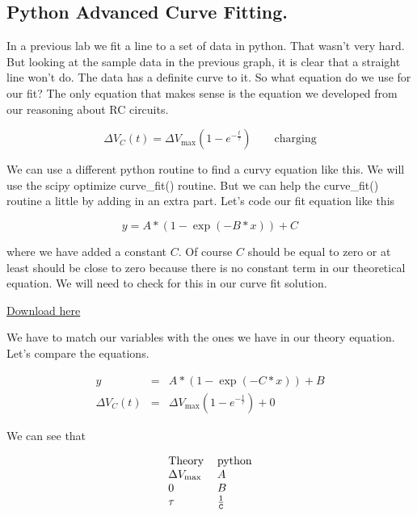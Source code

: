 \subsection{Python Advanced Curve Fitting.}

In a previous lab we fit a line to a set of data in python. That wasn't very hard. But looking at the sample data in the previous graph, it is clear that a straight line won't do.  The data has a definite curve to it. So what equation do we use for our fit? The only equation that makes sense is the equation we developed from our reasoning about RC circuits.

\begin{equation*}
	\Delta V_{C}\left( t\right) =\Delta V_{\max }\left( 1-e^{-\frac{t}{\tau }}\right) \qquad \text{charging}
\end{equation*}

We can use a different python routine to find a curvy equation like this.  We will use the scipy optimize curve\_fit() routine. But we can help the curve\_fit() routine a little by adding in an extra part. Let's code our fit equation like this

\begin{equation*}
	y=A\ast (1-\exp (-B\ast x))+C
\end{equation*}

where we have added a constant $C$. Of course $C$ should be equal to zero or at least should be close to zero because there is no constant term in our theoretical equation. We will need to check for this in our curve fit solution. 

\href{https://raw.githubusercontent.com/rtlines/IntermediateLabPH250/main/Code/user_function_curve_fit_2.py}{Download here}



We have to match our variables with the ones we have in our theory equation. Let's compare the equations. 

\begin{eqnarray*}
	y &=&A\ast (1-\exp (-C\ast x))+B \\
	\Delta V_{C}\left( t\right) &=&\Delta V_{\max }\left( 1-e^{-\frac{t}{\tau }}\right) +0
\end{eqnarray*}

We can see that 

\begin{equation*}
	\begin{tabular}{ll}
	                Theory & python \\ 
		$\Delta V_{\max }$ & $A$ \\ 
	                   $0$ & $B$ \\ 
	               $\tau $ & $\frac{1}{\mathtt{C}}$%
	\end{tabular}
\end{equation*}

